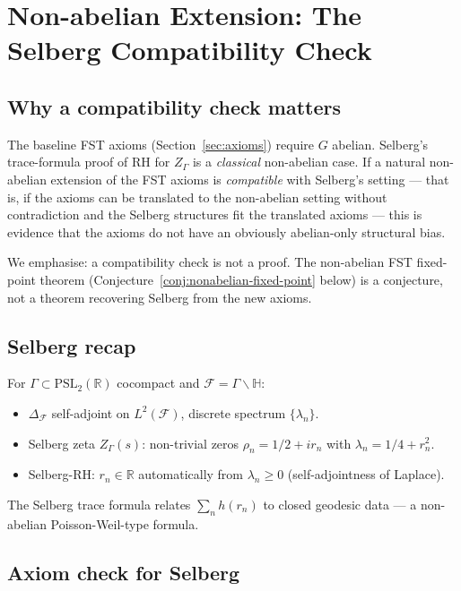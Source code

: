 \documentclass[11pt,a4paper]{article}
\theoremstyle{plain}
\theoremstyle{definition}
\newcommand{\R}{\mathbb{R}}
\begin{document}
\section{Non-abelian Extension: The Selberg Compatibility Check}
\label{sec:selberg}

\subsection{Why a compatibility check matters}

The baseline FST axioms (Section~\ref{sec:axioms}) require $G$
abelian.  Selberg's trace-formula proof of RH for $Z_\Gamma$
\cite{Selberg1956} is a
\emph{classical} non-abelian case.  If a natural non-abelian
extension of the FST axioms is \emph{compatible} with Selberg's
setting --- that is, if the axioms can be translated to the
non-abelian setting without contradiction and the Selberg structures
fit the translated axioms --- this is evidence that the axioms do
not have an obviously abelian-only structural bias.

We emphasise: a compatibility check is not a proof.  The non-abelian
FST fixed-point theorem (Conjecture~\ref{conj:nonabelian-fixed-point}
below) is a conjecture, not a theorem recovering Selberg from the
new axioms.

\subsection{Selberg recap}

For $\Gamma \subset \mathrm{PSL}_2(\R)$ cocompact and
$\mathcal F = \Gamma \backslash \mathbb H$:
\begin{itemize}
\item $\Delta_{\mathcal F}$ self-adjoint on $L^2(\mathcal F)$,
  discrete spectrum $\{\lambda_n\}$.
\item Selberg zeta $Z_\Gamma(s)$: non-trivial zeros
  $\rho_n = 1/2 + i r_n$ with $\lambda_n = 1/4 + r_n^2$.
\item Selberg-RH: $r_n \in \R$ automatically from
  $\lambda_n \geq 0$ (self-adjointness of Laplace).
\end{itemize}

The Selberg trace formula relates $\sum_n h(r_n)$ to closed
geodesic data --- a non-abelian Poisson-Weil-type formula.

\subsection{Axiom check for Selberg}
\end{document}
